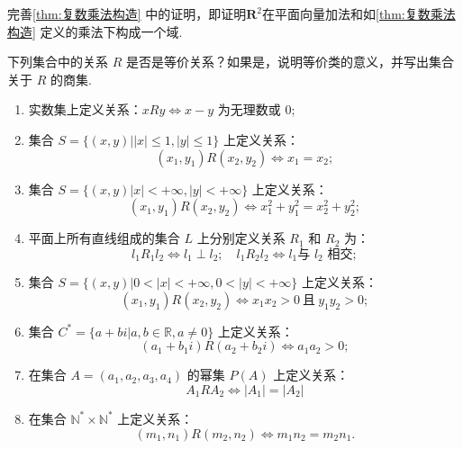\begin{exercise}

    \begin{exgroup}
        \item 完善\autoref{thm:复数乘法构造} 中的证明，即证明$\mathbf{R}^2$在平面向量加法和如\autoref*{thm:复数乘法构造} 定义的乘法下构成一个域.

        \item 下列集合中的关系 $ R $ 是否是等价关系？如果是，说明等价类的意义，并写出集合关于 $ R $ 的商集.
        \begin{enumerate}
            \item 实数集上定义关系：$ xRy \iff x - y $ 为无理数或 0;
            \item 集合 $ S = \{ (x, y) | |x| \leq 1, |y| \leq 1 \} $ 上定义关系：\[ (x_1, y_1) R (x_2, y_2) \iff x_1 = x_2; \]
            \item 集合 $ S = \{ (x, y) | x| < +\infty, |y| < +\infty \} $ 上定义关系：\[ (x_1, y_1) R (x_2, y_2) \iff x_1^2 + y_1^2 = x_2^2 + y_2^2; \]
            \item 平面上所有直线组成的集合 $ L $ 上分别定义关系 $ R_1 $ 和 $ R_2 $ 为：\[ l_1 R_1 l_2 \iff l_1 \perp l_2; \quad l_1 R_2 l_2 \iff l_1 \text{与 $l_2$ 相交};\]
            \item 集合 $ S = \{ (x, y) | 0 < |x| < +\infty, 0 < |y| < +\infty \} $ 上定义关系：\[ (x_1, y_1) R (x_2, y_2) \iff x_1 x_2 > 0 \ \text{且} \ y_1 y_2 > 0; \]
            \item 集合 $ C^* = \{ a + bi | a, b \in \mathbb{R}, a \neq 0 \} $ 上定义关系：\[ (a_1 + b_1 i) R (a_2 + b_2 i) \iff a_1 a_2 > 0; \]
            \item 在集合 $ A = (a_1, a_2, a_3, a_4) $ 的幂集 $ P(A) $ 上定义关系：\[ A_1 R A_2 \iff |A_1| = |A_2| \]
            \item 在集合 $ \mathbb{N}^* \times \mathbb{N}^* $ 上定义关系：\[ (m_1, n_1) R (m_2, n_2) \iff m_1 n_2 = m_2 n_1.\]
        \end{enumerate}


\end{exgroup}
\end{exercise}

